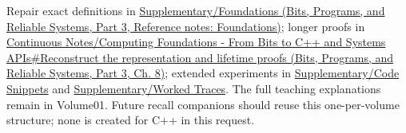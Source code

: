 Repair exact definitions in \href{../01-Bits-Programs-and-Reliable-Systems-P03/main.pdf\#nameddest=appendix-fd090d982a15}{Supplementary/Foundations (Bits, Programs, and Reliable Systems, Part 3, Reference notes: Foundations)}; longer proofs in \href{../01-Bits-Programs-and-Reliable-Systems-P03/main.pdf\#nameddest=01-foundations-i-ch010-reconstruct-the-representation-and-lifetime-proofs}{Continuous Notes/Computing Foundations - From Bits to C++ and Systems APIs\#Reconstruct the representation and lifetime proofs (Bits, Programs, and Reliable Systems, Part 3, Ch. 8)}; extended experiments in \hyperref[appendix-4e2236f53445]{Supplementary/Code Snippets} and \hyperref[appendix-92ff77d4dfdc]{Supplementary/Worked Traces}. The full teaching explanations remain in Volume01. Future recall companions should reuse this one-per-volume structure; none is created for C++ in this request.

